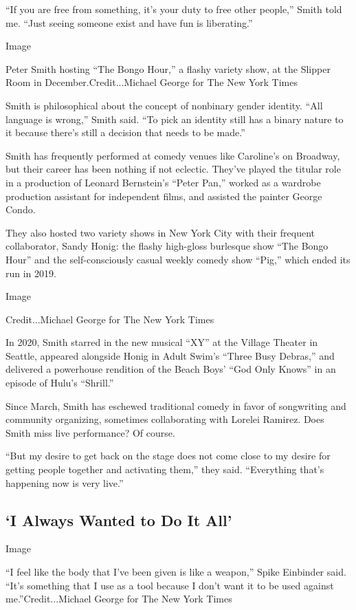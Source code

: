 ``If you are free from something, it's your duty to free other people,''
Smith told me. ``Just seeing someone exist and have fun is liberating.''

Image

Peter Smith hosting ``The Bongo Hour,'' a flashy variety show, at the
Slipper Room in December.Credit...Michael George for The New York Times

Smith is philosophical about the concept of nonbinary gender identity.
``All language is wrong,'' Smith said. ``To pick an identity still has a
binary nature to it because there's still a decision that needs to be
made.''

Smith has frequently performed at comedy venues like Caroline's on
Broadway, but their career has been nothing if not eclectic. They've
played the titular role in a production of Leonard Bernstein's ``Peter
Pan,'' worked as a wardrobe production assistant for independent films,
and assisted the painter George Condo.

They also hosted two variety shows in New York City with their frequent
collaborator, Sandy Honig: the flashy high-gloss burlesque show ``The
Bongo Hour'' and the self-consciously casual weekly comedy show ``Pig,''
which ended its run in 2019.

Image

Credit...Michael George for The New York Times

In 2020, Smith starred in the new musical ``XY'' at the Village Theater
in Seattle, appeared alongside Honig in Adult Swim's ``Three Busy
Debras,'' and delivered a powerhouse rendition of the Beach Boys' ``God
Only Knows'' in an episode of Hulu's ``Shrill.''

Since March, Smith has eschewed traditional comedy in favor of
songwriting and community organizing, sometimes collaborating with
Lorelei Ramirez. Does Smith miss live performance? Of course.

``But my desire to get back on the stage does not come close to my
desire for getting people together and activating them,'' they said.
``Everything that's happening now is very live.''

\hypertarget{i-always-wanted-to-do-it-all}{%
\subsection{`I Always Wanted to Do It
All'}\label{i-always-wanted-to-do-it-all}}

Image

``I feel like the body that I've been given is like a weapon,'' Spike
Einbinder said. ``It's something that I use as a tool because I don't
want it to be used against me.''Credit...Michael George for The New York
Times

